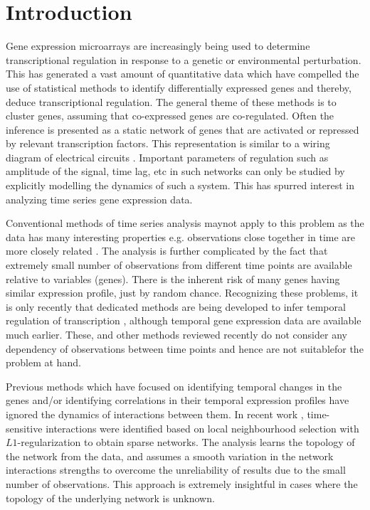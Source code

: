 \documentclass{bioinfo}
\begin{document}
\section{Introduction}

Gene expression microarrays are increasingly being used to determine transcriptional regulation  in response to a genetic or environmental perturbation. 
This has generated a vast amount of quantitative data which have compelled the use of statistical methods to identify differentially expressed genes and 
thereby, deduce transcriptional regulation. 
The general theme of these methods is to cluster genes, assuming that co-expressed genes are co-regulated. Often the inference is presented as a static network of genes that are activated or repressed by relevant transcription factors. 
This representation is similar to a wiring diagram of electrical circuits \citep{Stigler2007}. Important parameters of regulation such as amplitude of the 
signal, time lag, etc in such networks can only be studied by explicitly 
modelling the dynamics of such a system. This has spurred interest in 
analyzing time series gene expression data.

Conventional methods of time series analysis maynot apply to this 
problem as the data has many interesting properties e.g.  observations close together in time are more closely related \citep{Glass1993}. The analysis is 
further complicated  by the fact that
 extremely small number of observations from different time points are available relative to variables (genes). 
There is the inherent risk of many genes having similar expression profile, just by random chance. Recognizing these problems, it is only recently that dedicated methods are being developed to infer temporal regulation of transcription \citep{Leek06EDGE, Ernst06STEM, Ramoni02cluster}, although temporal gene expression data are available much earlier. 
These, and other methods reviewed recently \citep{Androulakis2007} do not consider any dependency of observations between time points and hence are not suitablefor the problem at hand.



Previous methods which have focused on identifying temporal changes in the genes and/or identifying correlations in their temporal expression profiles 
have ignored the dynamics of interactions between them. 
In recent work \citep{Song09KELLER}, time-sensitive interactions were identified based on local neighbourhood selection with $L1$-regularization to obtain sparse networks. The analysis learns the topology of the network from the data, and assumes a
smooth variation in the network interactions strengths to overcome the unreliability of results due to the small number of observations. 
This approach is extremely insightful in cases where the topology of the underlying network is unknown. 
\end{document}
